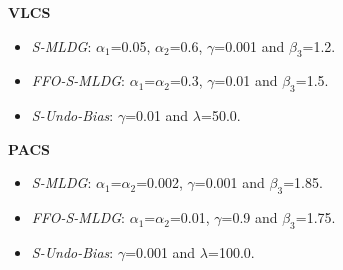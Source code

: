 \documentclass[runningheads]{llncs}
\newcommand{\cut}[1]{}
\newcommand{\nameS}{S-MLDG}
\newcommand{\nameFFS}{FFO-\nameS}
\newcommand{\hundo}{S-Undo-Bias}
\newcommand{\keypoint}[1]{\vspace{0.1cm}\noindent\textbf{#1}\quad}
\begin{document}
\keypoint{VLCS} 
\begin{itemize}
    \item \emph{\nameS{}}: $\alpha_1$=0.05, $\alpha_2$=0.6, $\gamma$=0.001 and $\beta_{3}$=1.2.
    
    \item \emph{\nameFFS{}}: $\alpha_1$=$\alpha_2$=0.3, $\gamma$=0.01 and $\beta_{3}$=1.5.
    
    \item \emph{\hundo}: $\gamma$=0.01 and $\lambda$=50.0.
\end{itemize}

 
\cut{
\keypoint{PACS(A)} 
\begin{itemize}
    \item \emph{\nameS{}}: $\alpha_1$=$\alpha_2$=0.001, $\gamma$=0.0005 and $\beta_{2}$=4.0.
     \item \emph{\nameFFS{}}: $\alpha_1$=$\alpha_2$=0.005, $\gamma$=0.85 and $\beta_{2}$=1.85.
    \item \emph{\hundo}: $\gamma$=0.001 and $\lambda$=300.0.
\end{itemize}}



\keypoint{PACS} 

\begin{itemize}
    \item \emph{\nameS{}}: $\alpha_1$=$\alpha_2$=0.002, $\gamma$=0.001 and $\beta_{3}$=1.85.
    \item \emph{\nameFFS{}}: $\alpha_1$=$\alpha_2$=0.01, $\gamma$=0.9 and $\beta_{3}$=1.75.
    \item \emph{\hundo}: $\gamma$=0.001 and $\lambda$=100.0.
\end{itemize}
\end{document}
